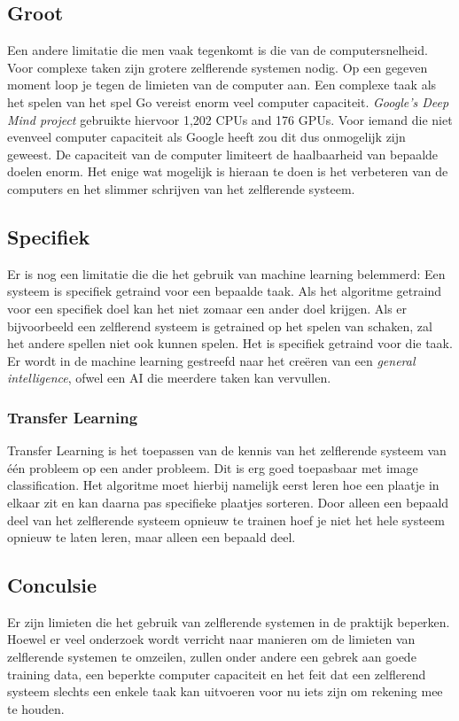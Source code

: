 \subsection{Groot}
Een andere limitatie die men vaak tegenkomt is die van de computersnelheid. Voor complexe taken zijn grotere zelflerende systemen nodig. Op een gegeven moment loop je tegen de limieten van de computer aan. Een complexe taak als het spelen van het spel Go vereist enorm veel computer capaciteit. \textit{Google’s Deep Mind project} gebruikte hiervoor 1,202 CPUs and 176 GPUs. \cite{GoogleDeepMindArticle}  Voor iemand die niet evenveel computer capaciteit als Google heeft zou dit dus onmogelijk zijn geweest. De capaciteit van de computer limiteert de haalbaarheid van bepaalde doelen enorm. Het enige wat mogelijk is hieraan te doen is het verbeteren van de computers en het slimmer schrijven van het zelflerende systeem.

\subsection{Specifiek}
Er is nog een limitatie die die het gebruik van machine learning belemmerd: Een systeem is specifiek getraind voor een bepaalde taak.  Als het algoritme getraind voor een specifiek doel kan het niet zomaar een ander doel krijgen. Als er bijvoorbeeld een zelflerend systeem is getrained op het spelen van schaken, zal het andere spellen niet ook kunnen spelen. Het is specifiek getraind voor die taak. Er wordt in de machine learning gestreefd naar het creëren van een \textit{general intelligence}, ofwel een AI die meerdere taken kan vervullen. 

\subsubsection{Transfer Learning}
Transfer Learning is het toepassen van de kennis van het zelflerende systeem van \'{e}\'{e}n probleem op een ander probleem. Dit is erg goed toepasbaar met image classification. Het algoritme moet hierbij namelijk eerst leren hoe een plaatje in elkaar zit en kan daarna pas specifieke plaatjes sorteren. Door alleen een bepaald deel van het zelflerende systeem opnieuw te trainen hoef je niet het hele systeem opnieuw te laten leren, maar alleen een bepaald deel. 

\subsection{Conculsie}
Er zijn limieten die het gebruik van zelflerende systemen in de praktijk beperken. Hoewel er veel onderzoek wordt verricht naar manieren om de limieten van zelflerende systemen te omzeilen, zullen onder andere een gebrek aan goede training data, een beperkte computer capaciteit en het feit dat een zelflerend systeem slechts een enkele taak kan uitvoeren voor nu iets zijn om rekening mee te houden.
